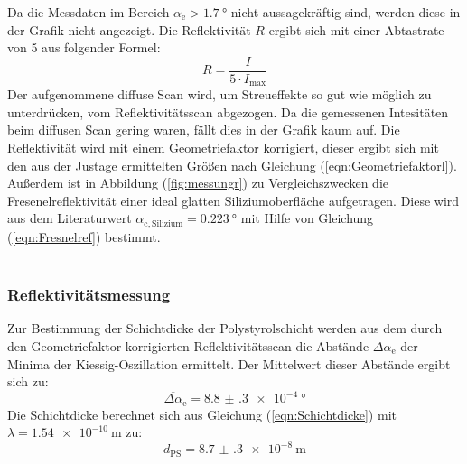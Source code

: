 \noindent Da die Messdaten im Bereich $\alpha_\mathrm{e} > \SI{1.7}{\degree}$ nicht aussagekräftig sind, werden diese in der Grafik nicht angezeigt. Die Reflektivität $R$ ergibt sich mit einer Abtastrate von 5 aus folgender Formel:
\begin{equation}
  R=\dfrac{I}{5\cdot I_\mathrm{max}}
\end{equation}
Der aufgenommene diffuse Scan wird, um Streueffekte so gut wie möglich zu unterdrücken, vom Reflektivitätsscan abgezogen. Da die gemessenen Intesitäten beim diffusen Scan gering waren, fällt
dies in der Grafik kaum auf. Die Reflektivität wird mit einem Geometriefaktor korrigiert, dieser ergibt sich mit den aus der Justage ermittelten Größen nach Gleichung (\ref{eqn:Geometriefaktorl}). Außerdem ist in Abbildung (\ref{fig:messungr}) zu Vergleichszwecken die Fresenelreflektivität einer ideal glatten Siliziumoberfläche  aufgetragen.
Diese wird aus dem Literaturwert \cite[5]{Anleitung3} $\alpha_\mathrm{c,Silizium} = \SI{0.223}{\degree}$ mit Hilfe von Gleichung (\ref{eqn:Fresnelref}) bestimmt. \\
\\
\subsubsection{Reflektivitätsmessung}
Zur Bestimmung der Schichtdicke der Polystyrolschicht werden aus dem durch den Geometriefaktor korrigierten Reflektivitätsscan die Abstände $\Delta\alpha_\mathrm{e}$ der Minima der Kiessig-Oszillation
ermittelt. Der Mittelwert dieser Abstände ergibt sich zu:
\begin{equation}
  \overline{\Delta\alpha}_\mathrm{e} = \SI{8.8(3) e-4}{\degree}
\end{equation}
Die Schichtdicke berechnet sich aus Gleichung (\ref{eqn:Schichtdicke}) mit $\lambda=\SI{1.54 e-10}{\meter}$ zu:
\begin{equation*}
  d_\mathrm{PS}=\SI{8.7(3) e-8}{\meter}
\end{equation*}
